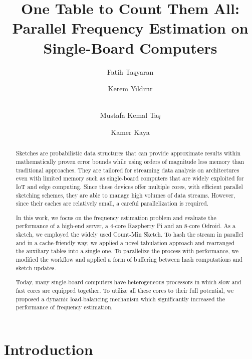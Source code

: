 \documentclass[runningheads]{llncs}
\begin{document}
\title{One Table to Count Them All:\\Parallel Frequency Estimation on Single-Board Computers}

\author{Fatih Ta\c{s}yaran \and
Kerem Y{\i}ld{\i}r{\i}r\and \\ 
Mustafa Kemal Ta\c{s} \and Kamer Kaya }

\maketitle            
\begin{abstract}
Sketches are probabilistic data structures that can provide approximate results within mathematically proven error bounds while using orders of magnitude less memory than traditional approaches. They are tailored for streaming data analysis on architectures even with limited memory such as single-board computers that are widely exploited for IoT and edge computing. Since these devices offer multiple cores, with efficient parallel sketching schemes, they are able to manage high volumes of data streams. However, since their caches are relatively small, a careful parallelization is required.

In this work, we focus on the frequency estimation problem and evaluate the performance of a high-end server, a 4-core Raspberry Pi and an 8-core Odroid. As a sketch, we employed the widely used Count-Min Sketch. 
To hash the stream in parallel and in a cache-friendly way, we applied a novel tabulation approach and rearranged the auxiliary tables into a single one. To parallelize the process with performance, we modified the workflow and applied a form of buffering between hash computations and sketch updates. 

Today, many single-board computers have heterogeneous processors in which slow and fast cores are equipped together. To utilize all these cores to their full potential, we proposed a dynamic load-balancing mechanism which significantly increased the performance of frequency estimation. 

\end{abstract}

\section{Introduction}
\end{document}
